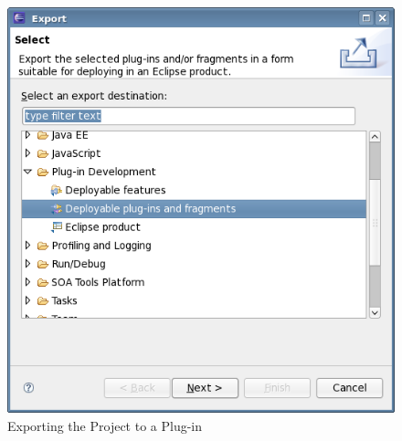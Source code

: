 \begin{enumerate}
\begin{figure}[h]
\begin{center}
\includegraphics[width=12.5cm]{Toolkit/GEF/PS/exportplugin}
\caption{Exporting the Project to a Plug-in}
\label{exportplugin}
\end{center}
\end{figure}

\end{enumerate}
